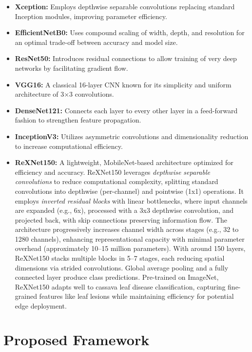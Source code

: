 \begin{itemize}
    \item \textbf{Xception:} Employs depthwise separable convolutions replacing standard Inception modules, improving parameter efficiency.
    \item \textbf{EfficientNetB0:} Uses compound scaling of width, depth, and resolution for an optimal trade-off between accuracy and model size.
    \item \textbf{ResNet50:} Introduces residual connections to allow training of very deep networks by facilitating gradient flow.
    \item \textbf{VGG16:} A classical 16-layer CNN known for its simplicity and uniform architecture of 3×3 convolutions.
    \item \textbf{DenseNet121:} Connects each layer to every other layer in a feed-forward fashion to strengthen feature propagation.
    \item \textbf{InceptionV3:} Utilizes asymmetric convolutions and dimensionality reduction to increase computational efficiency.
    \item \textbf{ReXNet150:} A lightweight, MobileNet-based architecture optimized for efficiency and accuracy. ReXNet150 leverages \textit{depthwise separable convolutions} to reduce computational complexity, splitting standard convolutions into depthwise (per-channel) and pointwise (1x1) operations. It employs \textit{inverted residual blocks} with linear bottlenecks, where input channels are expanded (e.g., 6x), processed with a 3x3 depthwise convolution, and projected back, with skip connections preserving information flow. The architecture progressively increases channel width across stages (e.g., 32 to 1280 channels), enhancing representational capacity with minimal parameter overhead (approximately 10–15 million parameters). With around 150 layers, ReXNet150 stacks multiple blocks in 5–7 stages, each reducing spatial dimensions via strided convolutions. Global average pooling and a fully connected layer produce class predictions. Pre-trained on ImageNet, ReXNet150 adapts well to cassava leaf disease classification, capturing fine-grained features like leaf lesions while maintaining efficiency for potential edge deployment.
\end{itemize}

\section{Proposed Framework}

